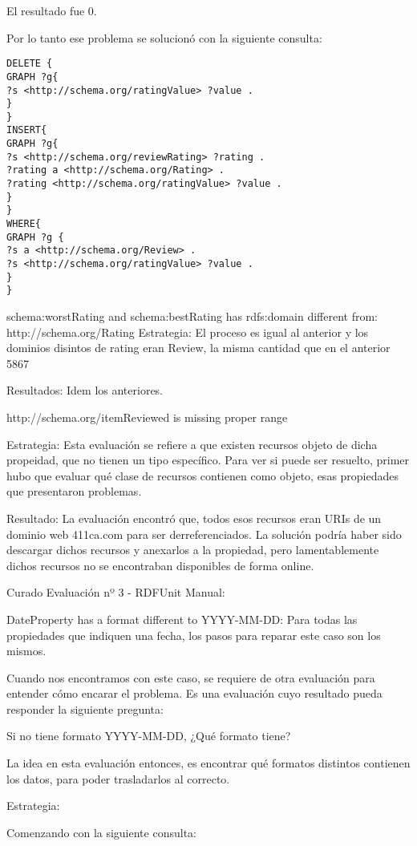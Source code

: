 El resultado fue 0.

Por lo tanto ese problema se solucionó con la siguiente consulta:

\begin{lstlisting}[frame=single]  
DELETE { 
GRAPH ?g{ 
?s <http://schema.org/ratingValue> ?value . 
} 
} 
INSERT{ 
GRAPH ?g{ 
?s <http://schema.org/reviewRating> ?rating . 
?rating a <http://schema.org/Rating> . 
?rating <http://schema.org/ratingValue> ?value . 
}
}
WHERE{
GRAPH ?g {
?s a <http://schema.org/Review> .
?s <http://schema.org/ratingValue> ?value .
}
}
\end{lstlisting}

schema:worstRating and schema:bestRating has rdfs:domain different from: http://schema.org/Rating
Estrategia:
El proceso es igual al anterior y los dominios disintos de rating eran Review, la misma cantidad que en el anterior 5867

Resultados: 
Idem los anteriores.

http://schema.org/itemReviewed is missing proper range

Estrategia:
Esta evaluación se refiere a que existen recursos objeto de dicha propeidad, que no tienen un tipo específico. Para ver si 
puede ser resuelto, primer hubo que evaluar qué clase de recursos contienen como objeto, esas propiedades que presentaron problemas.

Resultado:
La evaluación encontró que, todos esos recursos eran URIs de un dominio web 411ca.com para ser derreferenciados. La solución podría haber sido 
descargar dichos recursos y anexarlos a la propiedad, pero lamentablemente dichos recursos no se encontraban disponibles de forma online.

Curado Evaluación nº 3 - RDFUnit Manual:

{DateProperty} has a format different to YYYY-MM-DD:
Para todas las propiedades que indiquen una fecha, los pasos para reparar este caso son los mismos.

Cuando nos encontramos con este caso, se requiere de otra evaluación para entender cómo encarar el problema. Es una evaluación cuyo resultado
pueda responder la siguiente pregunta:

Si no tiene formato YYYY-MM-DD, ¿Qué formato tiene?

La idea en esta evaluación entonces, es encontrar qué formatos distintos contienen los datos, para poder trasladarlos al correcto.

Estrategia:

Comenzando con la siguiente consulta:


